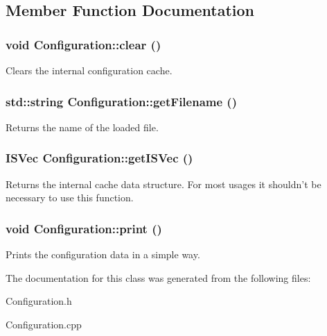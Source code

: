 \subsection{Member Function Documentation}
\hypertarget{classConfiguration_ab5137bfe94a9fcf22693367ca365b72c}{
\subsubsection[{clear}]{\setlength{\rightskip}{0pt plus 5cm}void Configuration::clear ()}}
\label{classConfiguration_ab5137bfe94a9fcf22693367ca365b72c}
Clears the internal configuration cache. \hypertarget{classConfiguration_a2a4e305ca7bb184b1f4221255a02aa76}{
\subsubsection[{getFilename}]{\setlength{\rightskip}{0pt plus 5cm}std::string Configuration::getFilename ()}}
\label{classConfiguration_a2a4e305ca7bb184b1f4221255a02aa76}
Returns the name of the loaded file. \hypertarget{classConfiguration_a2b9f9b1b127b8e3229c5cccab952d3b7}{
\subsubsection[{getISVec}]{\setlength{\rightskip}{0pt plus 5cm}ISVec Configuration::getISVec ()}}
\label{classConfiguration_a2b9f9b1b127b8e3229c5cccab952d3b7}
Returns the internal cache data structure. For most usages it shouldn't be necessary to use this function. \hypertarget{classConfiguration_a5c96c0cb75e5b619068b0045605844a5}{
\subsubsection[{print}]{\setlength{\rightskip}{0pt plus 5cm}void Configuration::print ()}}
\label{classConfiguration_a5c96c0cb75e5b619068b0045605844a5}
Prints the configuration data in a simple way. 

The documentation for this class was generated from the following files:\begin{DoxyCompactItemize}
\item 
Configuration.h\item 
Configuration.cpp\end{DoxyCompactItemize}

